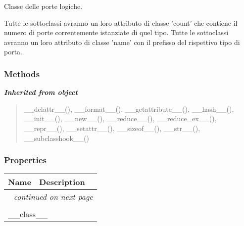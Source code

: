 Classe delle porte logiche.

Tutte le sottoclassi avranno un loro attributo di classe 'count' che 
contiene il numero di porte correntemente istanziate di quel tipo. Tutte le
sottoclassi avranno un loro attributo di classe 'name' con il prefisso del 
rispettivo tipo di porta.



  \subsubsection{Methods}


\large{\textbf{\textit{Inherited from object}}}

\begin{quote}
\_\_delattr\_\_(), \_\_format\_\_(), \_\_getattribute\_\_(), \_\_hash\_\_(), \_\_init\_\_(), \_\_new\_\_(), \_\_reduce\_\_(), \_\_reduce\_ex\_\_(), \_\_repr\_\_(), \_\_setattr\_\_(), \_\_sizeof\_\_(), \_\_str\_\_(), \_\_subclasshook\_\_()
\end{quote}


  \subsubsection{Properties}

    \vspace{-1cm}
\hspace{\varindent}\begin{longtable}{|p{\varnamewidth}|p{\vardescrwidth}|l}
\cline{1-2}
\cline{1-2} \centering \textbf{Name} & \centering \textbf{Description}& \\
\cline{1-2}
\endhead\cline{1-2}\multicolumn{3}{r}{\small\textit{continued on next page}}\\\endfoot\cline{1-2}
\endlastfoot\multicolumn{2}{|l|}{\textit{Inherited from object}}\\
\multicolumn{2}{|p{\varwidth}|}{\raggedright \_\_class\_\_}\\
\cline{1-2}
\end{longtable}


